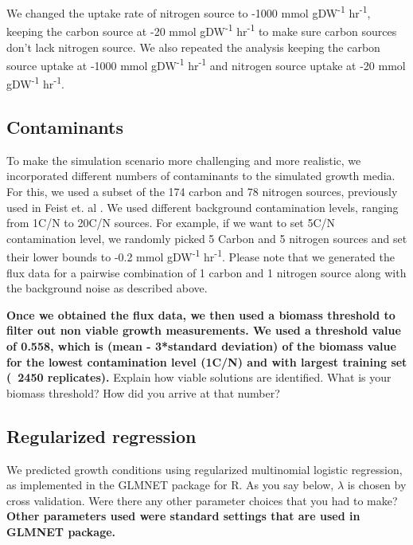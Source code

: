 \documentclass[12pt]{article}
\begin{document}
We changed the uptake rate of nitrogen source to -1000 mmol gDW\textsuperscript{-1} hr\textsuperscript{-1}, keeping the carbon source at -20 mmol gDW\textsuperscript{-1} hr\textsuperscript{-1} to make sure carbon sources don't lack nitrogen source. We also repeated the analysis keeping the carbon source uptake at -1000 mmol gDW\textsuperscript{-1} hr\textsuperscript{-1} and nitrogen source uptake at -20 mmol gDW\textsuperscript{-1} hr\textsuperscript{-1}. 

\subsection*{Contaminants}
To make the simulation scenario more challenging and more realistic, we incorporated different numbers of contaminants to the simulated growth media. For this, we used a subset of the 174 carbon and 78 nitrogen sources, previously used in Feist et. al \cite{Feistetal2007}.  We used different background contamination levels, ranging from 1C/N to 20C/N sources. For example, if we want to set 5C/N contamination level, we randomly picked 5 Carbon and 5 nitrogen sources and set their lower bounds to -0.2 mmol gDW\textsuperscript{-1} hr\textsuperscript{-1}. Please note that we generated the flux data for a pairwise combination of 1 carbon and 1 nitrogen source along with the background noise as described above. 

\textbf{Once we obtained the flux data, we then used a biomass threshold to filter out non viable growth measurements. We used a threshold value of 0.558, which is (mean - 3*standard deviation) of the biomass value for the lowest contamination level (1C/N) and with largest training set (~2450 replicates).}
{\color{red}Explain how viable solutions are identified. What is your biomass threshold? How did you arrive at that number?}


\subsection*{Regularized regression}

We predicted growth conditions using regularized multinomial logistic regression, as implemented in the GLMNET package \cite{Friedmanetal2010} for R. {\color{red}As you say below, $\lambda$ is chosen by cross validation. Were there any other parameter choices that you had to make?}\textbf{Other parameters used were standard settings that are used in GLMNET package.}
\end{document}
